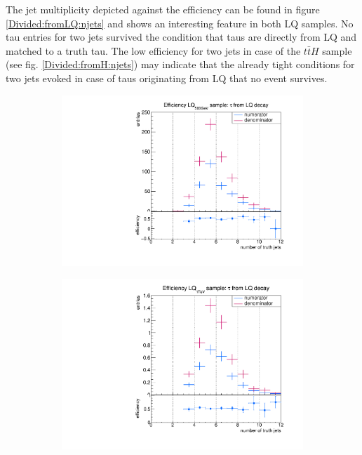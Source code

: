 %
The jet multiplicity depicted against the efficiency can be found in figure \ref{Divided:fromLQ:njets} and shows an interesting feature in both LQ samples. No tau entries for two jets survived the condition that taus are directly from LQ and matched to a truth tau. The low efficiency for two jets in case of the $t\bar{t}H$ sample (see fig. \ref{Divided:fromH:njets}) may indicate that the already tight conditions for two jets evoked in case of taus originating from LQ that no event survives. 
%
\begin{figure}
  \centering
                \begin{subfigure}[t]{0.49\textwidth}
                \includegraphics[width=\textwidth]{figures/plots/LQ75/Divided_fromLQnjets.pdf}
                \label{DividedFromLQ:signal:njetsLQ75}
                \end{subfigure}
                \begin{subfigure}[t]{0.49\textwidth}
                \includegraphics[width=\textwidth]{figures/plots/LQ76/Divided_fromLQnjets.pdf}

\end{subfigure}
\end{figure}
